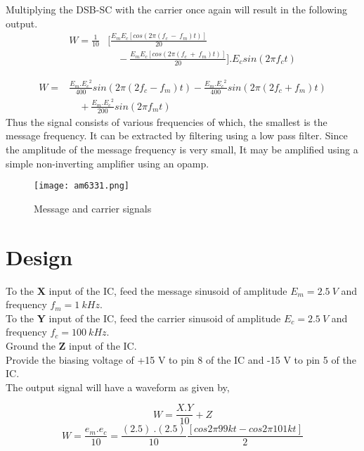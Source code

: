 Multiplying the DSB-SC with the carrier once again will result in the following output.
\begin{equation}
\begin{split}
W=\frac{1}{10} &[ \frac{E_mE_c [cos (2\pi (f_c\ -\ f_m)t)]}{20} \\
&\quad -\frac{E_mE_c[cos (2\pi (f_c\ +\ f_m)t)]}{20}].
 E_c sin(2\pi f_ct)
\end{split}
\end{equation}

\begin{equation}
\begin{split}
W=& \frac{E_m.{E_c}^2}{400}sin(2\pi (2f_c-f_m)t)  -  \frac{E_m.{E_c}^2}{400}sin(2\pi (2f_c+f_m)t)\\ 
&\quad +\frac{E_m.{E_c}^2}{200}sin(2\pi f_mt)
\end{split}
\end{equation}
Thus the signal consists of various frequencies of which, the smallest is the message frequency. It can be extracted by filtering using a low pass filter. Since the amplitude of the message frequency is very small, It may be amplified using a simple non-inverting amplifier using an opamp.

\begin{figure}[ht]
\texttt{[image: am6331.png]}
\caption{Message and carrier signals}
\label{msg633plot1}
\end{figure}
\section*{Design}

To the \textbf{X} input of the IC, feed the message sinusoid of amplitude $E_m=2.5\ V$ and frequency $f_m= 1\ kHz$.\\

To the \textbf{Y} input of the IC, feed the carrier sinusoid of amplitude $E_c=2.5\ V$ and frequency $f_c= 100\ kHz$.\\
Ground the \textbf{Z} input of the IC.\\
Provide the biasing voltage of +15 V to pin 8 of the IC and -15 V to pin 5 of the IC.\\

The output signal will have a waveform as given by,

\begin{equation}
W=\frac{X.Y}{10}+Z
\end{equation}
\begin{equation}
W=\frac{e_m.e_c}{10}=\frac{(2.5) \ .(2.5)}{10}\frac{[cos 2\pi99kt-cos 2\pi101kt]}{2}
\end{equation}

